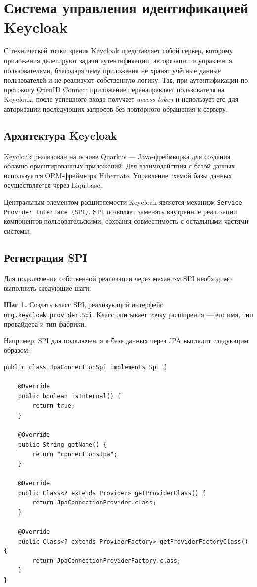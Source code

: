 \documentclass[times]{itmo-student-thesis}
\begin{document}
\section{Система управления идентификацией Keycloak}

С технической точки зрения Keycloak представляет собой сервер, которому приложения делегируют
задачи аутентификации, авторизации и управления пользователями, благодаря чему приложения не 
хранят учётные данные пользователей и не реализуют собственную логику.
Так, при аутентификации по протоколу OpenID Connect приложение перенаправляет
пользователя на Keycloak, после успешного входа получает \textit{access token}
и использует его для авторизации последующих запросов без повторного обращения к серверу.

\subsection{Архитектура Keycloak}

Keycloak реализован на основе Quarkus --- Java-фреймворка для создания облачно-ориентированных приложений. 
Для взаимодействия с базой данных используется ORM-фреймворк Hibernate. Управление схемой базы данных
осуществляется через Liquibase.

Центральным элементом расширяемости Keycloak является механизм \texttt{Service Provider Interface (SPI)}.
SPI позволяет заменять внутренние реализации компонентов пользовательскими, сохраняя совместимость с остальными частями системы.

\subsection{Регистрация SPI}

Для подключения собственной реализации через механизм SPI необходимо выполнить следующие шаги.

\textbf{Шаг 1.} Создать класс SPI, реализующий интерфейс \texttt{org.keycloak.provider.Spi}.
Класс описывает точку расширения --- его имя, тип провайдера и тип фабрики.

Например, SPI для подключения к базе данных через JPA выглядит следующим образом:

\begin{lstlisting}
public class JpaConnectionSpi implements Spi {

    @Override
    public boolean isInternal() {
        return true;
    }

    @Override
    public String getName() {
        return "connectionsJpa";
    }

    @Override
    public Class<? extends Provider> getProviderClass() {
        return JpaConnectionProvider.class;
    }

    @Override
    public Class<? extends ProviderFactory> getProviderFactoryClass() {
        return JpaConnectionProviderFactory.class;
    }
}
\end{lstlisting}
\end{document}
